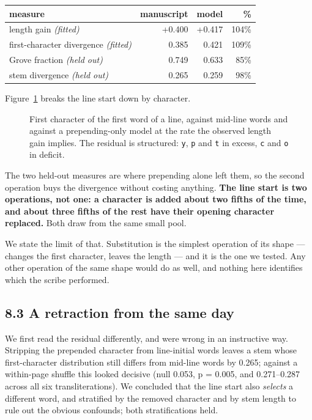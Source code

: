 \documentclass[11pt,a4paper]{article}
\begin{document}
\begin{table}[htbp]\centering\small
\begin{tabular}{@{}lrrr@{}}
\toprule
measure & manuscript & model & \% \\
\midrule
length gain \emph{(fitted)} & +0.400 & +0.417 & 104\% \\
first-character divergence \emph{(fitted)} & 0.385 & 0.421 & 109\% \\
Grove fraction \emph{(held out)} & 0.749 & 0.633 & 85\% \\
stem divergence \emph{(held out)} & 0.265 & 0.259 & 98\% \\
\bottomrule
\end{tabular}
\end{table}


Figure~\ref{fig:6} breaks the line start down by character.


\begin{figure}[htbp]\centering

\caption{First character of the first word of a line, against mid-line words and against a prepending-only model at the rate the observed length gain implies. The residual is structured: \texttt{y}, \texttt{p} and \texttt{t} in excess, \texttt{c} and \texttt{o} in deficit.}
\label{fig:6}
\end{figure}

The two held-out measures are where prepending alone left them, so the second operation buys the divergence without costing anything. \textbf{The line start is two operations, not one: a character is added about two fifths of the time, and about three fifths of the rest have their opening character replaced.} Both draw from the same small pool.


We state the limit of that. Substitution is the simplest operation of its shape --- changes the first character, leaves the length --- and it is the one we tested. Any other operation of the same shape would do as well, and nothing here identifies which the scribe performed.


\subsection*{8.3 A retraction from the same day}


We first read the residual differently, and were wrong in an instructive way. Stripping the prepended character from line-initial words leaves a stem whose first-character distribution still differs from mid-line words by 0.265; against a within-page shuffle this looked decisive (null 0.053, p = 0.005, and 0.271--0.287 across all six transliterations). We concluded that the line start also \emph{selects} a different word, and stratified by the removed character and by stem length to rule out the obvious confounds; both stratifications held.
\end{document}
